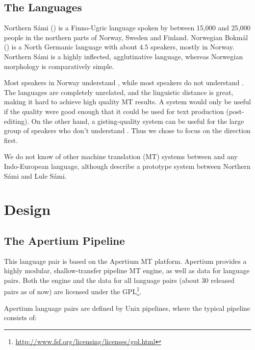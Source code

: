 \subsection{The Languages}
Northern S\'{a}mi (\sme{}) is a Finno-Ugric language spoken by between
15,000 and 25,000 people in the northern parts of Norway, Sweden and
Finland. Norwegian Bokm{\aa}l (\nob{}) is a North Germanic language with
about 4.5 speakers, mostly in Norway. Northern S\'{a}mi is a highly
inflected, agglutinative language, whereas Norwegian morphology is
comparatively simple.

Most \sme{} speakers in Norway understand \nob{}, while most \nob{}
speakers do not understand \sme{}. The languages are completely
unrelated, and the linguistic distance is great, making it hard to
achieve high quality MT results. A \nobsme{} system would only be useful if the
quality were good enough that it could be used for text production
(post-editing). On the other hand, a \smenob{} gisting-quality system
can be useful for the large group of \nob{} speakers who don't
understand \sme{}. Thus we chose to focus on the \smenob{} direction
first.

We do not know of other machine translation (MT) systems between \sme{}
and any Indo-European language, although \citet{tyers2009dpm} describe
a prototype system between Northern S\'{a}mi and Lule S\'{a}mi.



\section{Design}
 \label{sec:design}

\subsection{The Apertium Pipeline}
This language pair is based on the Apertium MT
platform\citep{forcada2011afp}. Apertium provides a highly modular,
shallow-transfer pipeline MT engine, as well as data for language
pairs. Both the engine and the data for all language pairs (about 30
released pairs as of now) are licensed under the
GPL\footnote{\href{http://www.fsf.org/licensing/licenses/gpl.html}{http://www.fsf.org/licensing/licenses/gpl.html}}.

Apertium language pairs are defined by Unix pipelines, where the
typical pipeline consists of:

